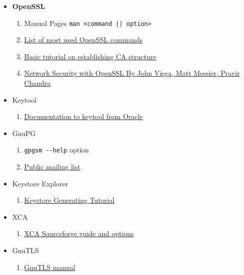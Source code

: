 \documentclass[10pt, a4paper]{report}
\begin{document}
\begin{itemize}
 \item \textbf{OpenSSL} 
    \begin{enumerate} 
      \item Manual Pages \verb+man <command || option>+
      \item \href{http://operational.io/openssl-commonly-used-commands/}{List of most used OpenSSL commands}
      \item \href{https://jamielinux.com/docs/openssl-certificate-authority/index.html}{Basic tutorial on establishing CA structure}
      \item \href{https://books.google.cz/books?id=IIqwAy4qEl0C&pg=PT4&lpg=PT4&dq=978-0-596-00270-1&source=bl&ots=mb74-Q3DXs&sig=RDQA26zKltVYA1_5PTSkd2tk-Ag&hl=sk&sa=X&ved=0ahUKEwj-mcT4wLrRAhWbIFAKHQcDAaYQ6AEIGTAA#v=onepage&q=978-0-596-00270-1&f=false}{Network Security with OpenSSL By John Viega, Matt Messier, Pravir Chandra}
    \end{enumerate}
 \item{Keytool}
    \begin{enumerate}
     \item \href{http://docs.oracle.com/javase/7/docs/technotes/tools/solaris/keytool.html}{Documentation to keytool from Oracle}
    \end{enumerate}
 \item{GnuPG}
  \begin{enumerate}
   \item \verb+gpgsm --help+ option
   \item \href{https://lists.gnupg.org/pipermail/gnupg-devel/2011-March/025989.html}{Public mailing list}
  \end{enumerate}
 \item{Keystore Explorer}
  \begin{enumerate}
   \item \href{http://help.farnedi.it/wp-content/uploads/2014/08/Generate_Keystore_with_KeyStore_Explorer.pdf}{Keystore Generating Tutorial}
  \end{enumerate}
 \item{XCA}
  \begin{enumerate}
   \item \href{http://xca.sourceforge.net/xca.html}{XCA Sourceforge guide and options}
  \end{enumerate}
 \item{GnuTLS}
  \begin{enumerate}
   \item \href{https://www.gnutls.org/manual/html_node/certtool-Invocation.html}{GnuTLS manual}

\end{enumerate}
\end{itemize}
\end{document}
